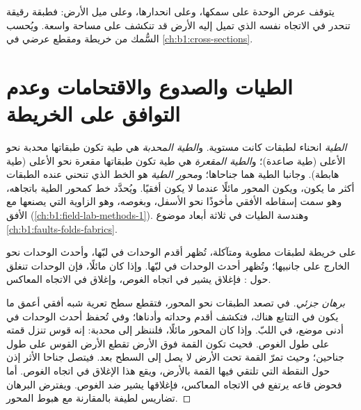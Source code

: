 \begin{remark}\label{rem:b1:geological-maps:width}
يتوقف عرض  الوحدة على سمكها، وعلى انحدارها، وعلى ميل الأرض: فطبقة رقيقة تنحدر في الاتجاه نفسه الذي تميل إليه الأرض قد تنكشف على مساحة واسعة. ويُحسب السُّمك من خريطة ومقطع عرضي في \cref{ch:b1:cross-sections}.
\end{remark}

\section{الطيات والصدوع والاقتحامات وعدم التوافق على الخريطة}

\begin{definition}\label{def:b1:geological-maps:fold}
\emph{الطية} انحناء لطبقات كانت مستوية. و\emph{الطية المحدبة} هي طية تكون طبقاتها محدبة نحو الأعلى (طية صاعدة)؛ و\emph{الطية المقعرة} هي طية تكون طبقاتها مقعرة نحو الأعلى (طية هابطة). وجانبا الطية هما جناحاها؛ و\emph{محور الطية} هو الخط الذي تنحني عنده الطبقات أكثر ما يكون، ويكون المحور مائلًا عندما لا يكون أفقيًا. ويُحدَّد خط كمحور الطية باتجاهه، وهو سمت إسقاطه الأفقي مأخوذًا نحو الأسفل، وبغوصه، وهو الزاوية التي يصنعها مع الأفق (\cref{ch:b1:field-lab-methods-1}). وهندسة الطيات في ثلاثة أبعاد موضوع \cref{ch:b1:faults-folds-fabrics}.
\end{definition}

\begin{proposition}\label{prop:b1:geological-maps:folds}
على خريطة لطبقات مطوية ومتآكلة، تُظهر  أقدم الوحدات في لبّها، وأحدث الوحدات نحو الخارج على جانبيها؛ وتُظهر  أحدث الوحدات في لبّها. وإذا كان  مائلًا، فإن  الوحدات تنغلق حول : فإغلاق  يشير في اتجاه الغوص، وإغلاق  في الاتجاه المعاكس.
\end{proposition}

\begin{proof}[برهان جزئي]
في  تصعد الطبقات نحو المحور، فتقطع سطح تعرية شبه أفقي أعمق ما يكون في التتابع هناك، فتكشف أقدم وحداته وأدناها؛ وفي  تُحفظ أحدث الوحدات في أدنى موضع، في اللبّ. وإذا كان المحور مائلًا، فلننظر إلى   محدبة: إنه قوس تنزل قمته على طول الغوص. فحيث تكون القمة فوق الأرض تقطع الأرض القوس على طول جناحين؛ وحيث تمرّ القمة تحت الأرض لا يصل  إلى السطح بعد. فيتصل جناحا الأثر إذن حول النقطة التي تلتقي فيها القمة بالأرض، ويقع هذا الإغلاق في اتجاه الغوص. أما  فحوض قاعه يرتفع في الاتجاه المعاكس، فإغلاقها يشير ضد الغوص. ويفترض البرهان تضاريس لطيفة بالمقارنة مع هبوط المحور.
\end{proof}

